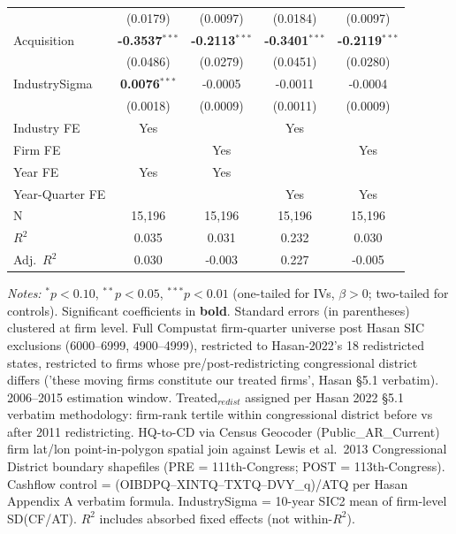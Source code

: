 \begin{landscape}
\begin{table}[H]
\begin{tabular}{lcccc}
 & (0.0179) & (0.0097) & (0.0184) & (0.0097) \\
Acquisition & \textbf{-0.3537}$^{***}$ & \textbf{-0.2113}$^{***}$ & \textbf{-0.3401}$^{***}$ & \textbf{-0.2119}$^{***}$ \\
 & (0.0486) & (0.0279) & (0.0451) & (0.0280) \\
IndustrySigma & \textbf{0.0076}$^{***}$ & -0.0005 & -0.0011 & -0.0004 \\
 & (0.0018) & (0.0009) & (0.0011) & (0.0009) \\
\midrule
Industry FE & Yes &  & Yes &  \\
Firm FE &  & Yes &  & Yes \\
Year FE & Yes & Yes &  &  \\
Year-Quarter FE &  &  & Yes & Yes \\
\midrule
N & 15,196 & 15,196 & 15,196 & 15,196 \\
$R^2$ & 0.035 & 0.031 & 0.232 & 0.030 \\
Adj.~$R^2$ & 0.030 & -0.003 & 0.227 & -0.005 \\
\bottomrule
\end{tabular}
\begin{minipage}{\linewidth}
\vspace{2pt}\scriptsize
\textit{Notes:} $^{*}p<0.10$, $^{**}p<0.05$, $^{***}p<0.01$ (one-tailed for IVs, $\beta > 0$; two-tailed for controls).
 Significant coefficients in \textbf{bold}.
 Standard errors (in parentheses) clustered at firm level.
 Full Compustat firm-quarter universe post Hasan SIC exclusions (6000--6999, 4900--4999), restricted to Hasan-2022's 18 redistricted states, restricted to firms whose pre/post-redistricting congressional district differs ('these moving firms constitute our treated firms', Hasan \S5.1 verbatim). 2006--2015 estimation window. Treated$_{redist}$ assigned per Hasan 2022 \S5.1 verbatim methodology: firm-rank tertile within congressional district before vs after 2011 redistricting. HQ-to-CD via Census Geocoder (Public\_AR\_Current) firm lat/lon point-in-polygon spatial join against Lewis et al.\ 2013 Congressional District boundary shapefiles (PRE = 111th-Congress; POST = 113th-Congress). Cashflow control = (OIBDPQ--XINTQ--TXTQ--DVY\_q)/ATQ per Hasan Appendix A verbatim formula. IndustrySigma = 10-year SIC2 mean of firm-level SD(CF/AT).
 $R^2$ includes absorbed fixed effects (not within-$R^2$).
\end{minipage}
\end{table}
\end{landscape}